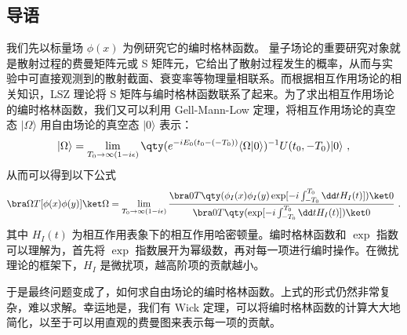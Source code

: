 
\subsection{导语}
我们先以标量场 $\phi(x)$ 为例研究它的编时格林函数。
量子场论的重要研究对象就是散射过程的费曼矩阵元或 S 矩阵元，它给出了散射过程发生的概率，从而与实验中可直接观测到的散射截面、衰变率等物理量相联系。而根据相互作用场论的相关知识，LSZ 理论将 S 矩阵与编时格林函数联系了起来。为了求出相互作用场论的编时格林函数，我们又可以利用 Gell-Mann-Low 定理，将相互作用场论的真空态 $|\Omega\rangle$ 用自由场论的真空态 $|0\rangle$ 表示：
\begin{equation}
|\Omega\rangle = \lim\limits_{T_0\rightarrow \infty(1-i\epsilon)}\qty(e^{-iE_0(t_0-(-T_0))}\langle \Omega|0\rangle )^{-1}U(t_0,-T_0)|0\rangle~,
\end{equation}
从而可以得到以下公式
\begin{equation}\label{eq_wick_1}
\bra\Omega T[\phi(x)\phi(y)]\ket\Omega = \lim\limits_{T_0\rightarrow \infty(1-i\epsilon)}\frac{\bra 0 T\qty(\phi_I(x)\phi_I(y)\exp[-i\int_{-T_0}^{T_0}\dd t H_I(t)])\ket 0}{\bra 0 T\qty(\exp[-i\int_{-T_0}^{T_0}\dd t H_I(t)])\ket 0}~.
\end{equation}
其中 $H_I(t)$ 为相互作用表象下的相互作用哈密顿量。编时格林函数和 $\exp$ 指数可以理解为，首先将 $\exp$ 指数展开为幂级数，再对每一项进行编时操作。在微扰理论的框架下，$H_I$ 是微扰项，越高阶项的贡献越小。

于是最终问题变成了，如何求自由场论的编时格林函数。上式的形式仍然非常复杂，难以求解。幸运地是，我们有 Wick 定理，可以将编时格林函数的计算大大地简化，以至于可以用直观的费曼图来表示每一项的贡献。
